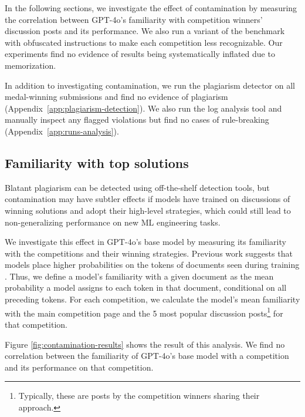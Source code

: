 \documentclass{article} %
\begin{document}
In the following sections, we investigate the effect of contamination by measuring the correlation between GPT-4o's familiarity with competition winners' discussion posts and its performance. We also run a variant of the benchmark with obfuscated instructions to make each competition less recognizable. Our experiments find no evidence of results being systematically inflated due to memorization.

In addition to investigating contamination, we run the plagiarism detector on all medal-winning submissions and find no evidence of plagiarism (Appendix~\ref{app:plagiarism-detection}). We also run the log analysis tool and manually inspect any flagged violations but find no cases of rule-breaking (Appendix~\ref{app:runs-analysis}).

\subsection{Familiarity with top solutions}

Blatant plagiarism can be detected using off-the-shelf detection tools, but contamination may have subtler effects if models have trained on discussions of winning solutions and adopt their high-level strategies, which could still lead to non-generalizing performance on new ML engineering tasks.

We investigate this effect in GPT-4o's base model by measuring its familiarity with the competitions and their winning strategies. Previous work suggests that models place higher probabilities on the tokens of documents seen during training \citep{carlini_quantifying_2023}. Thus, we define a model's familiarity with a given document as the mean probability a model assigns to each token in that document, conditional on all preceding tokens. For each competition, we calculate the model's mean familiarity with the main competition page and the 5 most popular discussion posts\footnote{Typically, these are posts by the competition winners sharing their approach.} for that competition.

Figure \ref{fig:contamination-results} shows the result of this analysis. We find no correlation between the familiarity of GPT-4o's base model with a competition and its performance on that competition.
\end{document}
